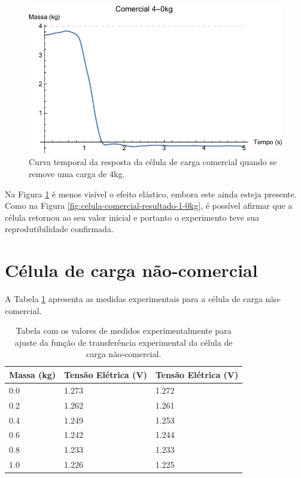 \documentclass[a4paper]{instrumentacao}
\begin{document}
\begin{figure}[H]
\center
\includegraphics[width=\textwidth]{Comercial_4-0kg.pdf}
\caption{Curva temporal da resposta da célula de carga comercial quando se remove uma carga de 4kg.}
\label{fig:celula-comercial-resultado-4-0kg}
\end{figure}

Na Figura \ref{fig:celula-comercial-resultado-4-0kg} é menos visível o efeito elástico, embora este ainda esteja presente. Como na Figura \ref{fig:celula-comercial-resultado-1-0kg}, é possível afirmar que a célula retornou ao seu valor inicial e portanto o experimento teve sua reprodutibilidade confirmada.

\section{Célula de carga não-comercial}
A Tabela \ref{tab:celula-nao-comercial-resultado-funcao-transferencia} apresenta as medidas experimentais para a célula de carga não-comercial.


\begin{table}[H]
\centering
\caption{Tabela com os valores de medidos experimentalmente para ajuste da função de transferência experimental da célula de carga não-comercial.}
\begin{tabular}{|l|l|l|}

\hline
\textbf{Massa (kg)} & \textbf{Tensão Elétrica (V)} & \textbf{Tensão Elétrica (V)} \\ \hline
 0.0 & 1.273 & 1.272 \\ \hline
 0.2 & 1.262 & 1.261 \\ \hline
 0.4 & 1.249 & 1.253 \\ \hline
 0.6 & 1.242 & 1.244 \\ \hline
 0.8 & 1.233 & 1.233 \\ \hline
 1.0 & 1.226 & 1.225 \\ \hline
\end{tabular}
\label{tab:celula-nao-comercial-resultado-funcao-transferencia}
\end{table}
\end{document}
